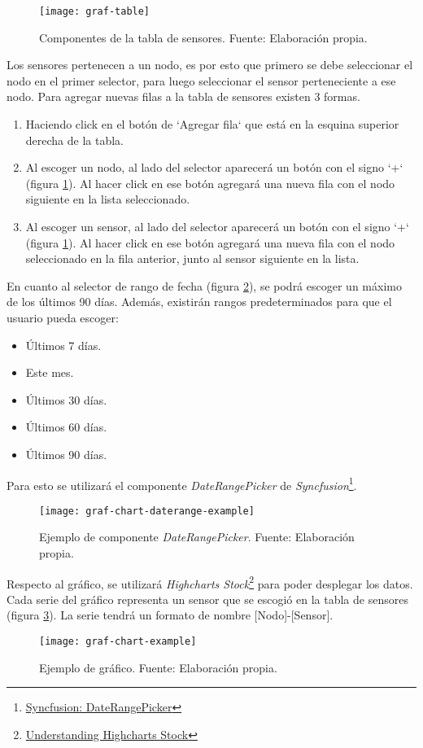 \begin{figure}[H]
	\centering
	\texttt{[image: graf-table]}
	\caption{\label{fig:graf-table} Componentes de la tabla de sensores. Fuente: Elaboración propia.}
\end{figure}

Los sensores pertenecen a un nodo, es por esto que primero se debe seleccionar el nodo en el primer selector, para luego seleccionar el sensor perteneciente a ese nodo.
Para agregar nuevas filas a la tabla de sensores existen 3 formas.
\begin{enumerate}
    \item Haciendo click en el botón de `Agregar fila` que está en la esquina superior derecha de la tabla.
    \item Al escoger un nodo, al lado del selector aparecerá un botón con el signo `+` (figura \ref{fig:graf-table}). Al hacer click en ese botón agregará una nueva fila con el nodo siguiente en la lista seleccionado.
    \item Al escoger un sensor, al lado del selector aparecerá un botón con el signo `+` (figura \ref{fig:graf-table}). Al hacer click en ese botón agregará una nueva fila con el nodo seleccionado en la fila anterior, junto al sensor siguiente en la lista.
\end{enumerate}

En cuanto al selector de rango de fecha (figura \ref{fig:graf-chart-daterange-example}), se podrá escoger un máximo de los últimos 90 días. Además, existirán rangos predeterminados para que el usuario pueda escoger:
\begin{itemize}
    \item Últimos 7 días.
    \item Este mes.
    \item Últimos 30 días.
    \item Últimos 60 días.
    \item Últimos 90 días.
\end{itemize}
Para esto se utilizará el componente \textit{DateRangePicker} de \textit{Syncfusion}\footnote{\href{https://ej2.syncfusion.com/react/documentation/daterangepicker/getting-started}{Syncfusion: DateRangePicker}}.
\begin{figure}[H]
	\centering
	\texttt{[image: graf-chart-daterange-example]}
	\caption{\label{fig:graf-chart-daterange-example} Ejemplo de componente \textit{DateRangePicker}. Fuente: Elaboración propia.}
\end{figure}
Respecto al gráfico, se utilizará \textit{Highcharts Stock}\footnote{\href{https://www.highcharts.com/docs/stock/understanding-highcharts-stock}{Understanding Highcharts Stock}} para poder desplegar los datos. Cada serie del gráfico representa un sensor que se escogió en la tabla de sensores (figura \ref{fig:graf-chart-example}). La serie tendrá un formato de nombre [Nodo]-[Sensor].
\begin{figure}[H]
	\centering
	\texttt{[image: graf-chart-example]}
	\caption{\label{fig:graf-chart-example} Ejemplo de gráfico. Fuente: Elaboración propia.}
\end{figure}

